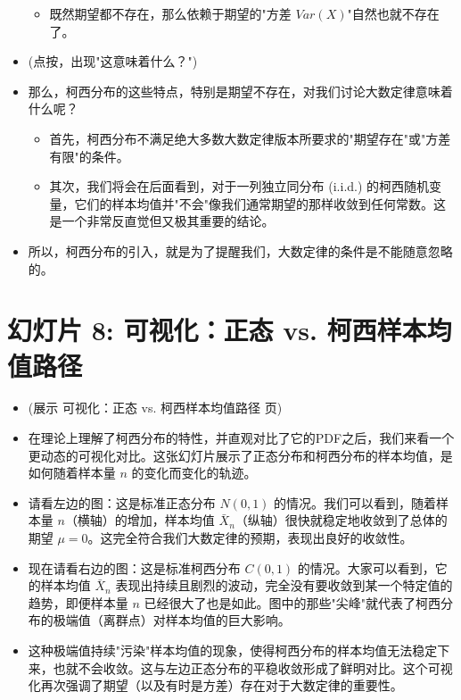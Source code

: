 \documentclass[UTF8]{article} %
\begin{document}
\begin{itemize}
\begin{itemize}[label=\textbullet, itemsep=0.3em]
        \item 既然期望都不存在，那么依赖于期望的"方差 $Var(X)$"自然也就不存在了。
    \end{itemize}
    \item (点按，出现"这意味着什么？")
    \item 那么，柯西分布的这些特点，特别是期望不存在，对我们讨论大数定律意味着什么呢？
    \begin{itemize}[label=\textbullet, itemsep=0.3em]
        \item 首先，柯西分布不满足绝大多数大数定律版本所要求的"期望存在"或"方差有限"的条件。
        \item 其次，我们将会在后面看到，对于一列独立同分布 (i.i.d.) 的柯西随机变量，它们的样本均值并"不会"像我们通常期望的那样收敛到任何常数。这是一个非常反直觉但又极其重要的结论。
    \end{itemize}
    \item 所以，柯西分布的引入，就是为了提醒我们，大数定律的条件是不能随意忽略的。
\end{itemize}

\section*{幻灯片 8: 可视化：正态 vs. 柯西样本均值路径}
\begin{itemize}
    \itemsep1em
    \item (展示 可视化：正态 vs. 柯西样本均值路径 页)
    \item 在理论上理解了柯西分布的特性，并直观对比了它的PDF之后，我们来看一个更动态的可视化对比。这张幻灯片展示了正态分布和柯西分布的样本均值，是如何随着样本量 $n$ 的变化而变化的轨迹。
    \item 请看左边的图：这是标准正态分布 $N(0,1)$ 的情况。我们可以看到，随着样本量 $n$（横轴）的增加，样本均值 $\bar{X}_n$（纵轴）很快就稳定地收敛到了总体的期望 $\mu=0$。这完全符合我们大数定律的预期，表现出良好的收敛性。
    \item 现在请看右边的图：这是标准柯西分布 $C(0,1)$ 的情况。大家可以看到，它的样本均值 $\bar{X}_n$ 表现出持续且剧烈的波动，完全没有要收敛到某一个特定值的趋势，即便样本量 $n$ 已经很大了也是如此。图中的那些"尖峰"就代表了柯西分布的极端值（离群点）对样本均值的巨大影响。
    \item 这种极端值持续"污染"样本均值的现象，使得柯西分布的样本均值无法稳定下来，也就不会收敛。这与左边正态分布的平稳收敛形成了鲜明对比。这个可视化再次强调了期望（以及有时是方差）存在对于大数定律的重要性。
\end{itemize}
\end{document}
